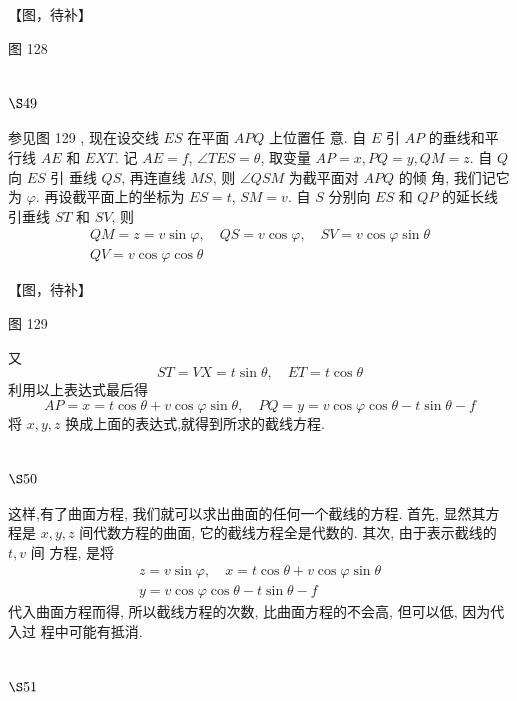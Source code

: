 【图，待补】

图 128 

\section{$\S 49$}

参见图 129 , 现在设交线 $E S$ 在平面 $A P Q$ 上位置任 意. 自 $E$ 引 $A P$ 的垂线和平行线 $A E$ 和 $E X T$. 记 $A E=f$, $\angle T E S=\theta$, 取变量 $A P=x, P Q=y, Q M=z$. 自 $Q$ 向 $E S$ 引 垂线 $Q S$, 再连直线 $M S$, 则 $\angle Q S M$ 为截平面对 $A P Q$ 的倾 角, 我们记它为 $\varphi$. 再设截平面上的坐标为 $E S=t$, $S M=v$. 自 $S$ 分别向 $E S$ 和 $Q P$ 的延长线引垂线 $S T$ 和 $S V$, 则
\[
\begin{gathered}
Q M=z=v \sin \varphi, \quad Q S=v \cos \varphi, \quad S V=v \cos \varphi \sin \theta \\
Q V=v \cos \varphi \cos \theta
\end{gathered}
\]

【图，待补】

图 129

又
\[
S T=V X=t \sin \theta, \quad E T=t \cos \theta
\]
利用以上表达式最后得
\[
A P=x=t \cos \theta+v \cos \varphi \sin \theta, \quad P Q=y=v \cos \varphi \cos \theta-t \sin \theta-f
\]
将 $x, y, z$ 换成上面的表达式,就得到所求的截线方程.

\section{$\S 50$}

这样,有了曲面方程, 我们就可以求出曲面的任何一个截线的方程. 首先, 显然其方 程是 $x, y, z$ 间代数方程的曲面, 它的截线方程全是代数的. 其次, 由于表示截线的 $t, v$ 间 方程, 是将
\[
\begin{gathered}
z=v \sin \varphi, \quad x=t \cos \theta+v \cos \varphi \sin \theta \\
y=v \cos \varphi \cos \theta-t \sin \theta-f
\end{gathered}
\]
代入曲面方程而得, 所以截线方程的次数, 比曲面方程的不会高, 但可以低, 因为代入过 程中可能有抵消.

\section{$\S 51$}

